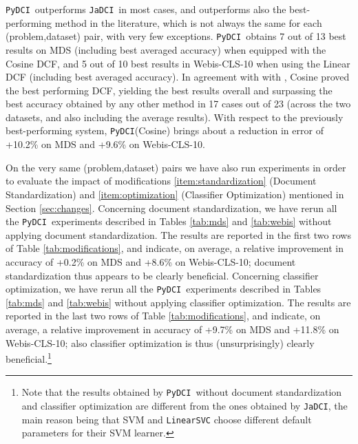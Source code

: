 \documentclass{article}
\newcommand{\jadci}{\texttt{JaDCI}}
\newcommand{\pydci}{\texttt{PyDCI}}
\begin{document}
\pydci\ outperforms \jadci\ in most cases, and outperforms also the
best-performing method in the literature, which is not always the same
for each (problem,dataset) pair, with very few exceptions.  \pydci\
obtains 7 out of 13 best results on MDS (including best averaged
accuracy) when equipped with the Cosine DCF, and 5 out of 10 best
results in Webis-CLS-10 when using the Linear DCF (including best
averaged accuracy).  In agreement with with \citep{Moreo:2016fg},
Cosine proved the best performing DCF, yielding the best results
overall and surpassing the best accuracy obtained by any other method
in 17 cases out of 23 (across the two datasets, and also including the
average results).  With respect to the previously best-performing
system, \pydci(Cosine) brings about a reduction in error of +10.2\% on
MDS and +9.6\% on Webis-CLS-10.

On the very same (problem,dataset) pairs we have also run experiments
in order to evaluate the impact of modifications
\ref{item:standardization} (Document Standardization) and
\ref{item:optimization} (Classifier Optimization) mentioned in Section
\ref{sec:changes}. Concerning document standardization, we have rerun
all the \pydci\ experiments described in Tables \ref{tab:mds} and
\ref{tab:webis} without applying document standardization. The results
are reported in the first two rows of Table \ref{tab:modifications},
and indicate, on average, a relative improvement in accuracy of +0.2\%
on MDS and +8.6\% on Webis-CLS-10; document standardization thus
appears to be clearly beneficial. Concerning classifier optimization,
we have rerun all the \pydci\ experiments described in Tables
\ref{tab:mds} and \ref{tab:webis} without applying classifier
optimization. The results are reported in the last two rows of Table
\ref{tab:modifications}, and indicate, on average, a relative
improvement in accuracy of +9.7\% on MDS and +11.8\% on Webis-CLS-10;
also classifier optimization is thus (unsurprisingly) clearly
beneficial.\footnote{Note that the results obtained by \pydci\ without
document standardization and classifier optimization are different
from the ones obtained by \jadci, the main reason being that
SVM and \texttt{LinearSVC} choose different default
parameters for their SVM learner.}
\end{document}
